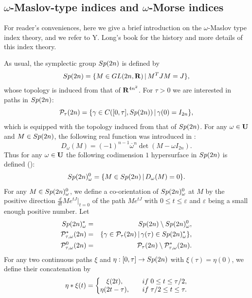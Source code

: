 \documentclass[11pt]{article}
\def\bea{\begin{eqnarray}}
\def\eea{\end{eqnarray}}
\def\nn{\nonumber}
\def\bs{\setminus}
\def\R{{\bf R}}
\def\U{{\bf U}}
\def\ga{{\gamma}}
\def\om{{\omega}}
\def\P{{\cal P}}
\def\Sp{{\rm Sp}}
\def\ol#1{\overline{#1}}
\begin{document}
\subsection{$\omega$-Maslov-type indices and $\omega$-Morse indices}\label{subsec:5.2}

For reader's conveniences, here we give a brief introduction on the $\om$-Maslov type
index theory, and we refer to Y. Long's book \cite{Lon4} for the history and more details
of this index theory.

As usual, the symplectic group $\Sp(2n)$ is defined by
$$ \Sp(2n) = \{M\in {\rm GL}(2n,\R)\,|\,M^TJM=J\}, $$
whose topology is induced from that of $\R^{4n^2}$. For $\tau>0$
we are interested in paths in $\Sp(2n)$:
$$ \P_{\tau}(2n) = \{\ga\in C([0,\tau],\Sp(2n))\,|\,\ga(0)=I_{2n}\}, $$
which is equipped with the topology induced from that of $\Sp(2n)$.
For any $\om\in\U$ and $M\in\Sp(2n)$, the following real function was
introduced in \cite{Lon2}:
$$ D_{\om}(M) = (-1)^{n-1}\ol{\om}^n\det(M-\om I_{2n}). $$
Thus for any $\om\in\U$ the following codimension $1$ hypersurface
in $\Sp(2n)$ is defined (\cite{Lon2}):
$$ \Sp(2n)_{\om}^0 = \{M\in\Sp(2n)\,|\, D_{\om}(M)=0\}.  $$
For any $M\in \Sp(2n)_{\om}^0$, we define a co-orientation of
$\Sp(2n)_{\om}^0$ at $M$ by the positive direction
$\frac{d}{dt}Me^{t J}|_{t=0}$ of the path $Me^{t J}$ with $0\le t\le
\varepsilon$ and $\varepsilon$ being a small enough positive number. Let
\bea
\Sp(2n)_{\om}^{\ast} &=& \Sp(2n)\bs \Sp(2n)_{\om}^0,   \nn\\
\P_{\tau,\om}^{\ast}(2n) &=&
      \{\ga\in\P_{\tau}(2n)\,|\,\ga(\tau)\in\Sp(2n)_{\om}^{\ast}\}, \nn\\
\P_{\tau,\om}^0(2n) &=& \P_{\tau}(2n)\bs \P_{\tau,\om}^{\ast}(2n). \nn\eea
For any two continuous paths $\xi$ and $\eta:[0,\tau]\to\Sp(2n)$ with
$\xi(\tau)=\eta(0)$, we define their concatenation by
$$ \eta\ast\xi(t) = \left\{\begin{matrix}
            \xi(2t), & \quad {\rm if}\;0\le t\le \tau/2, \cr
            \eta(2t-\tau), & \quad {\rm if}\; \tau/2\le t\le \tau. \cr\end{matrix}\right. $$
\end{document}
